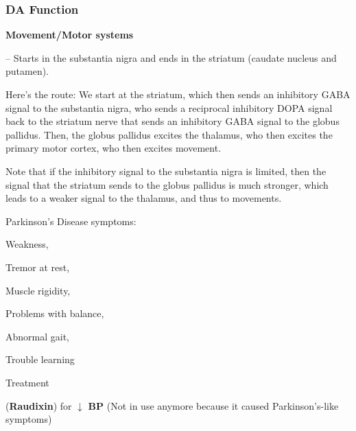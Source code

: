 \subsubsection{DA Function}

\begin{coloredlist}
    \item \textbf{Movement/Motor systems}
    \begin{coloredlist}
        \item {} -- Starts in the substantia nigra and ends in the striatum (caudate nucleus and putamen).
        \item Here's the route: We start at the striatum, which then sends an inhibitory GABA signal to the substantia nigra, who sends a reciprocal inhibitory DOPA signal back to the striatum nerve that sends an inhibitory GABA signal to the globus pallidus. Then, the globus pallidus excites the thalamus, who then excites the primary motor cortex, who then excites movement.
        \begin{coloredlist}
            \item Note that if the inhibitory signal to the substantia nigra is limited, then the signal that the striatum sends to the globus pallidus is much stronger, which leads to a weaker signal to the thalamus, and thus to movements.
        \end{coloredlist}
        \item Parkinson's Disease symptoms:
        \begin{coloredlist}
            \item Weakness,
            \item Tremor at rest,
            \item Muscle rigidity,
            \item Problems with balance,
            \item Abnormal gait,
            \item Trouble learning
        \end{coloredlist}
        \item Treatment
        \begin{coloredlist}
            \item {} (\textbf{Raudixin}) for \(\downarrow\) \textbf{BP} (Not in use anymore because it caused Parkinson's-like symptoms)

\end{coloredlist}
\end{coloredlist}
\end{coloredlist}
